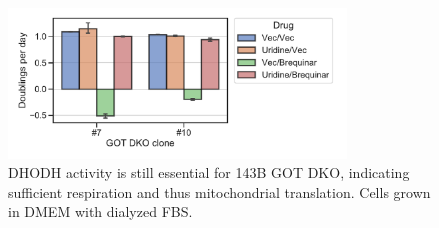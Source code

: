 \begin{figure}[ht]
    \centering
    \includegraphics[width=0.8\textwidth]{figures/sapp/DKO_char/143B_DKO_brequinar.pdf}
    \caption[143B GOT DKO DHODH inhibitor sensitivity]{
    DHODH activity is still essential for 143B GOT DKO, indicating sufficient respiration and thus mitochondrial translation.
    Cells grown in DMEM with dialyzed FBS.
    }
    \label{fig:sapp:DKO_char:143B_DKO_brequinar}
\end{figure}






